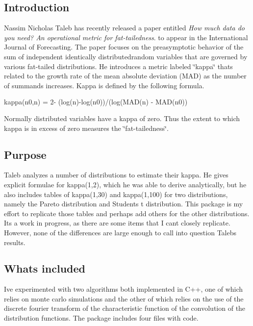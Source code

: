 \subsection*{Introduction}

Nassim Nicholas Taleb has recently released a paper entitled {\itshape How much data do you need? An operational metric for fat-\/tailedness}. to appear in the International Journal of Forecasting. The paper focuses on the preasymptotic behavior of the sum of independent identically distributedrandom variables that are governed by various fat-\/tailed distributions. He introduces a metric labeled \char`\"{}kappa\char`\"{} that\textquotesingle{}s related to the growth rate of the mean absolute deviation (M\+AD) as the number of summands increases. Kappa is defined by the following formula.

kappa(n0,n) = 2-\/ (log(n)-\/log(n0))/(log(M\+A\+D(n) -\/ M\+A\+D(n0))

Normally distributed variables have a kappa of zero. Thus the extent to which kappa is in excess of zero measures the \char`\"{}fat-\/tailedness\char`\"{}.

\subsection*{Purpose}

Taleb analyzes a number of distributions to estimate their kappa. He gives explicit formulae for kappa(1,2), which he was able to derive analytically, but he also includes tables of kappa(1,30) and kappa(1,100) for two distributions, namely the Pareto distribution and Student\textquotesingle{}s t distribution. This package is my effort to replicate those tables and perhaps add others for the other distributions. It\textquotesingle{}s a work in progress, as there are some items that I can\textquotesingle{}t closely replicate. However, none of the differences are large enough to call into question Taleb\textquotesingle{}s results.

\subsection*{What\textquotesingle{}s included}

I\textquotesingle{}ve experimented with two algorithms both implemented in C++, one of which relies on monte carlo simulations and the other of which relies on the use of the discrete fourier transform of the characteristic function of the convolution of the distribution functions. The package includes four files with code.


